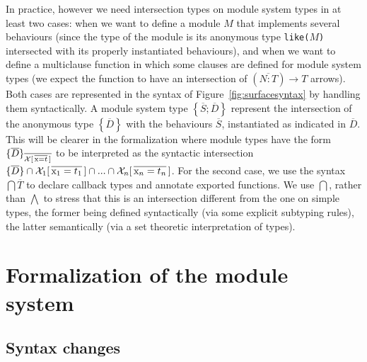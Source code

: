 \documentclass[a4paper,10pt]{article}
\begin{document}
  In practice, however we need intersection types on module system types in at least two cases: when we want to define a module $M$ that implements several behaviours (since the type of the module is its anonymous type \texttt{like($M$)} intersected with its properly instantiated behaviours), and when we want to define a multiclause function in which some clauses are defined for module system types (we expect the function to have an intersection of $(\overline{N:T})\to T$ arrows). Both cases are represented in the syntax of Figure~\ref{fig:surfacesyntax} by handling them syntactically. A module system type $\left\{\overline{S};\overline{D}\right\}$ represent the intersection of the anonymous type $\left\{\overline{D}\right\}$ with the behaviours $\overline{S}$, instantiated as indicated in $\overline{D}$. This will be clearer in the formalization where module types have the form $\{\overline{D}\}_{\overline{\mathcal{X}[\,\overline{\text{\rm x}=t}\,]}}$ to be interpreted as the syntactic intersection $\{\overline D\}\cap{\ensuremath{\mathcal{X}}_1[\,\overline{\text{\rm x}_1=t_1}\,]}\cap...\cap{\ensuremath{\mathcal{X}}_n[\,\overline{\text{\rm x}_n=t_n}\,]}$. For the second case, we use the syntax $\bigcap \overline{T}$ to declare callback types and annotate exported functions. We use $\bigcap$, rather than $\bigwedge$ to stress that this is an intersection different from the one on simple types, the former being defined syntactically (via some explicit subtyping rules), the latter semantically (via a set theoretic interpretation of types).

  


\section{Formalization of the module system}

\subsection{Syntax changes}
\end{document}
